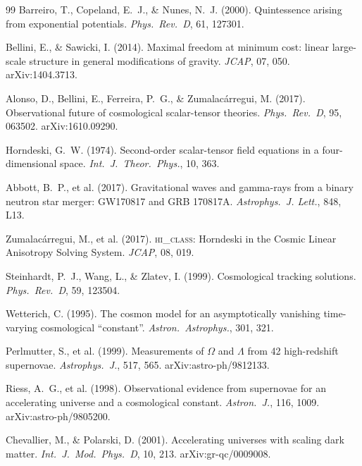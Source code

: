 \documentclass[12pt,a4paper]{article}
\begin{document}
\begin{thebibliography}{99}
  Barreiro, T., Copeland, E.~J., \& Nunes, N.~J. (2000).
  Quintessence arising from exponential potentials.
  \textit{Phys.\ Rev.\ D}, 61, 127301.

  Bellini, E., \& Sawicki, I. (2014).
  Maximal freedom at minimum cost: linear large-scale structure in
  general modifications of gravity.
  \textit{JCAP}, 07, 050. arXiv:1404.3713.

  Alonso, D., Bellini, E., Ferreira, P.~G., \& Zumalac\'arregui, M. (2017).
  Observational future of cosmological scalar-tensor theories.
  \textit{Phys.\ Rev.\ D}, 95, 063502. arXiv:1610.09290.

  Horndeski, G.~W. (1974).
  Second-order scalar-tensor field equations in a four-dimensional space.
  \textit{Int.\ J.\ Theor.\ Phys.}, 10, 363.

  Abbott, B.~P., et al. (2017).
  Gravitational waves and gamma-rays from a binary neutron star merger:
  GW170817 and GRB 170817A.
  \textit{Astrophys.\ J. Lett.}, 848, L13.

  Zumalacárregui, M., et al. (2017).
  \textsc{hi\_class}: Horndeski in the Cosmic Linear Anisotropy Solving
  System.
  \textit{JCAP}, 08, 019.

  Steinhardt, P.~J., Wang, L., \& Zlatev, I. (1999).
  Cosmological tracking solutions.
  \textit{Phys.\ Rev.\ D}, 59, 123504.

  Wetterich, C. (1995).
  The cosmon model for an asymptotically vanishing time-varying
  cosmological ``constant''.
  \textit{Astron.\ Astrophys.}, 301, 321.

  Perlmutter, S., et al. (1999).
  Measurements of $\Omega$ and $\Lambda$ from 42 high-redshift supernovae.
  \textit{Astrophys.\ J.}, 517, 565.
  arXiv:astro-ph/9812133.

  Riess, A.~G., et al. (1998).
  Observational evidence from supernovae for an accelerating universe and a
  cosmological constant.
  \textit{Astron.\ J.}, 116, 1009.
  arXiv:astro-ph/9805200.

  Chevallier, M., \& Polarski, D. (2001).
  Accelerating universes with scaling dark matter.
  \textit{Int.\ J.\ Mod.\ Phys.\ D}, 10, 213.
  arXiv:gr-qc/0009008.


\end{thebibliography}
\end{document}
